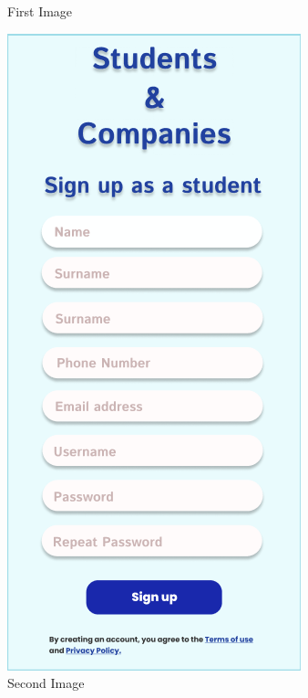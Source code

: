 \begin{figure}[ht]
\begin{minipage}{0.45\textwidth}
        \caption{First Image}
        \label{fig:image1}
    \end{minipage}
    \hfill
    \begin{minipage}{0.45\textwidth}
        \centering
        \includegraphics[width=\textwidth]{RASD-Latex/assets/UI images/signup_student_phone.png}
        \caption{Second Image}
        \label{fig:image2}
    \end{minipage}
\end{figure}


